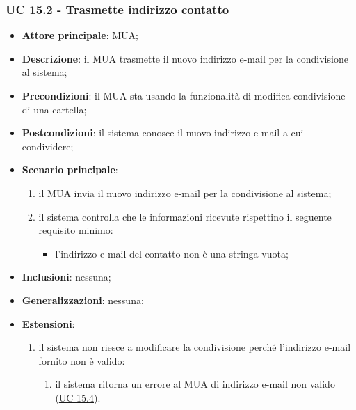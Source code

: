     \subsubsection{UC 15.2 - Trasmette indirizzo contatto} \label{sec:UC15.2}
    \begin{itemize}
        \item \textbf{Attore principale}: MUA;
        \item \textbf{Descrizione}: il MUA trasmette il nuovo indirizzo e-mail per la condivisione al sistema;
        \item \textbf{Precondizioni}: il MUA sta usando la funzionalità di modifica condivisione di una cartella;
        \item \textbf{Postcondizioni}: il sistema conosce il nuovo indirizzo e-mail a cui condividere;
        \item \textbf{Scenario principale}:
            \begin{enumerate}
                \item il MUA invia il nuovo indirizzo e-mail per la condivisione al sistema;
                \item il sistema controlla che le informazioni ricevute rispettino il seguente requisito minimo:
                    \begin{itemize}
                        \item l'indirizzo e-mail del contatto non è una stringa vuota;
                    \end{itemize}
            \end{enumerate}
        \item \textbf{Inclusioni}: nessuna;
        \item \textbf{Generalizzazioni}: nessuna;
        \item \textbf{Estensioni}:
            \begin{enumerate}[label=\alph*.]
                \item il sistema non riesce a modificare la condivisione perché l'indirizzo e-mail fornito non è valido:
                \begin{enumerate}[label=\arabic*.]
                    \item il sistema ritorna un errore al MUA di indirizzo e-mail non valido (\hyperref[sec:UC15.4]{UC 15.4}).
                \end{enumerate}
            \end{enumerate}
    \end{itemize}


